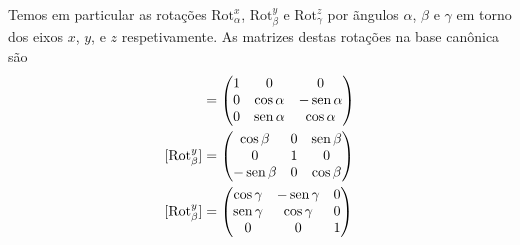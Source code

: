 \documentclass[12pt]{amsart}
\DeclareMathOperator{\sen}{\textrm{\rm sen}}
\newcommand{\rot}[1]{{\textrm{Rot}}_{#1}}
\theoremstyle{definition}
\begin{document}
Temos em particular as rotações $\rot{\alpha}^x$, $\rot\beta^y$ e $\rot\gamma^z$ 
por ãngulos $\alpha$, $\beta$ e $\gamma$ em torno dos eixos $x$, $y$, e $z$ respetivamente.
As matrizes destas rotações na base canônica são 
\begin{align*}
    [\rot\alpha^x]&=\begin{pmatrix} 1 & 0 & 0 \\ 0 & \cos\alpha & -\sen\alpha \\ 0 & \sen\alpha & \cos\alpha
    \end{pmatrix}\\
    [\rot\beta^y]&=\begin{pmatrix} \cos\beta & 0 & \sen\beta \\ 0 & 1 & 0 \\  -\sen\beta & 0 & \cos\beta\end{pmatrix}\\
    [\rot\beta^y]&=\begin{pmatrix} \cos\gamma & -\sen\gamma  & 0 \\ \sen\gamma & \cos\gamma & 0 \\ 0 & 0 & 1\end{pmatrix}
\end{align*}
\end{document}
